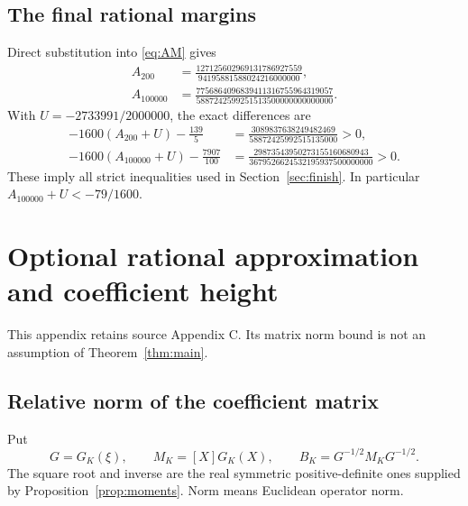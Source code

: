 \subsection{The final rational margins}
Direct substitution into \eqref{eq:AM} gives
\begin{align*}
 A_{200}&=\frac{127125602969131786927559}{94195881588024216000000},\\
 A_{100000}&=\frac{7756864096839411316755964319057}
                  {5887242599251513500000000000000}.
\end{align*}
With $U=-2733991/2000000$, the exact differences are
\begin{align}
 -1600(A_{200}+U)-\frac{139}{5}
 &=\frac{3089837638249482469}{58872425992515135000}>0,
 \label{eq:margin200}\\
 -1600(A_{100000}+U)-\frac{7907}{100}
 &=\frac{29873543950273155160680943}
          {3679526624532195937500000000}>0.
 \label{eq:marginlarge}
\end{align}
These imply all strict inequalities used in Section~\ref{sec:finish}.
In particular $A_{100000}+U<-79/1600$.

\section{Optional rational approximation and coefficient height}
\label{app:approx}
This appendix retains source Appendix C. Its matrix norm bound is not an
assumption of Theorem~\ref{thm:main}.

\subsection{Relative norm of the coefficient matrix}
Put
\[
 G=G_K(\xi),\qquad M_K=[X]G_K(X),\qquad
 B_K=G^{-1/2}M_KG^{-1/2}.
\]
The square root and inverse are the real symmetric positive-definite
ones supplied by Proposition~\ref{prop:moments}. Norm means Euclidean
operator norm.

